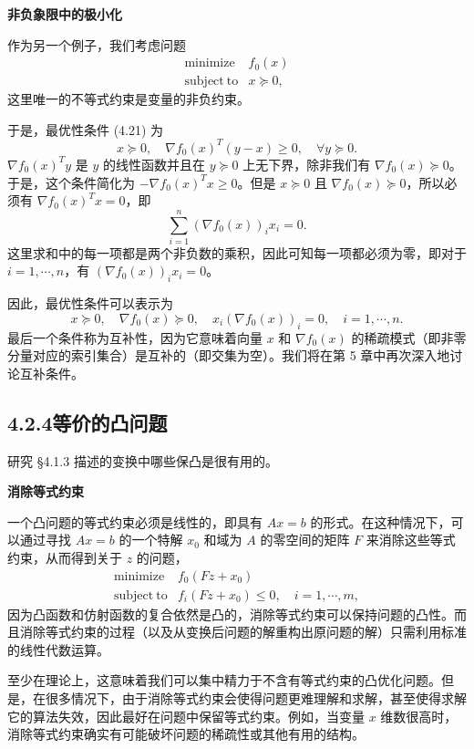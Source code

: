 \documentclass[UTF8,12pt,a4paper,fontset=fandol]{ctexart}
\begin{document}
\noindent\textbf{非负象限中的极小化}

作为另一个例子，我们考虑问题
\[
\begin{array}{ll}
\mathop{\mathrm{minimize}} & f_0(x)\\
\mathrm{subject\ to} & x\succeq 0,
\end{array}
\]
这里唯一的不等式约束是变量的非负约束。

于是，最优性条件 (4.21) 为
\[
x\succeq 0,\quad \nabla f_0(x)^T(y-x)\geq 0,\quad \forall y\succeq 0.
\]
$\nabla f_0(x)^Ty$ 是 $y$ 的线性函数并且在 $y\succeq 0$ 上无下界，除非我们有 $\nabla f_0(x)\succeq 0$。于是，这个条件简化为 $-\nabla f_0(x)^Tx\geq 0$。但是 $x\succeq 0$ 且 $\nabla f_0(x)\succeq 0$，所以必须有 $\nabla f_0(x)^Tx=0$，即
\[
\sum_{i=1}^{n}(\nabla f_0(x))_i x_i=0.
\]
这里求和中的每一项都是两个非负数的乘积，因此可知每一项都必须为零，即对于 $i=1,\cdots,n$，有 $(\nabla f_0(x))_i x_i=0$。

因此，最优性条件可以表示为
\[
x\succeq 0,\quad \nabla f_0(x)\succeq 0,\quad x_i(\nabla f_0(x))_i=0,\quad i=1,\cdots,n.
\]
最后一个条件称为互补性，因为它意味着向量 $x$ 和 $\nabla f_0(x)$ 的稀疏模式（即非零分量对应的索引集合）是互补的（即交集为空）。我们将在第 5 章中再次深入地讨论互补条件。

\subsection*{4.2.4\quad 等价的凸问题}

研究 §4.1.3 描述的变换中哪些保凸是很有用的。

\noindent\textbf{消除等式约束}

一个凸问题的等式约束必须是线性的，即具有 $Ax=b$ 的形式。在这种情况下，可以通过寻找 $Ax=b$ 的一个特解 $x_0$ 和域为 $A$ 的零空间的矩阵 $F$ 来消除这些等式约束，从而得到关于 $z$ 的问题，
\[
\begin{array}{ll}
\mathop{\mathrm{minimize}} & f_0(Fz+x_0)\\
\mathrm{subject\ to} & f_i(Fz+x_0)\leq 0,\quad i=1,\cdots,m,
\end{array}
\]
因为凸函数和仿射函数的复合依然是凸的，消除等式约束可以保持问题的凸性。而且消除等式约束的过程（以及从变换后问题的解重构出原问题的解）只需利用标准的线性代数运算。

至少在理论上，这意味着我们可以集中精力于不含有等式约束的凸优化问题。但是，在很多情况下，由于消除等式约束会使得问题更难理解和求解，甚至使得求解它的算法失效，因此最好在问题中保留等式约束。例如，当变量 $x$ 维数很高时，消除等式约束确实有可能破坏问题的稀疏性或其他有用的结构。
\end{document}
